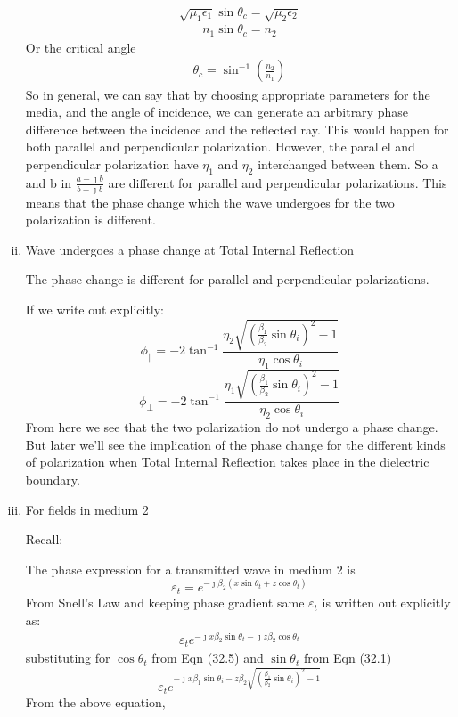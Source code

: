 \begin{enumerate}[(i)]
\begin{equation*}
\sqrt{\mu_1\epsilon_1} \sin\theta_c = \sqrt{\mu_2\epsilon_2}
\end{equation*}
\begin{align*}
n_1 \sin\theta_c = n_2
\end{align*}
Or the critical angle
\begin{align*}
\theta_c = \sin^{-1}(\frac{n_2}{n_1}) 
\end{align*}
So in general, we can say that by choosing appropriate parameters for the media, and the angle of incidence, we can generate an arbitrary phase difference between the incidence and the reflected ray. This would happen for both parallel and perpendicular polarization. However, the parallel and perpendicular polarization have $\eta_1$ and $\eta_2$
interchanged between them. So a and b in $\frac{a - \jmath b}{b + \jmath b}$ are different for parallel and perpendicular polarizations. This means that the phase change which the wave undergoes for the two polarization is different.

\item Wave undergoes a phase change at Total Internal Reflection

The phase change is different for parallel and perpendicular polarizations.

If we write out explicitly:
\begin{equation}
\phi_\parallel = -2\tan^{-1}\frac{\eta_2\sqrt{(\frac{\beta_1}{\beta_2}\sin\theta_i)^2-1}}{\eta_1\cos\theta_i}
\end{equation}
\begin{equation}
\phi_\perp = -2\tan^{-1}\frac{\eta_1\sqrt{(\frac{\beta_1}{\beta_2}\sin\theta_i)^2-1}}{\eta_2\cos\theta_i}
\end{equation}
From here we see that the two polarization do not undergo a phase change. But later we'll see the implication of the phase change for the different kinds of polarization when Total Internal Reflection takes place in the dielectric boundary. 

\item For fields in medium 2

Recall:

The phase expression for a transmitted wave in medium 2 is
\begin{equation*}
\varepsilon_t = e^{-\jmath \beta_2(x\sin\theta_t + z\cos\theta_t)}
\end{equation*}
From Snell's Law and keeping phase gradient same $\varepsilon_t$ is written out explicitly as:
\begin{align}
\varepsilon_te^{- \jmath x\beta_2\sin\theta_t - \jmath z\beta_2\cos\theta_t}
\end{align}
substituting for $\cos\theta_t$ from Eqn (32.5)
and $\sin\theta_t$ from Eqn (32.1)
\begin{equation}
\varepsilon_te^{- {\jmath x\beta_1\sin\theta_i} - z \beta_2\sqrt{{(\frac{\beta_1}{\beta_2}\sin\theta_i)}^2 - 1}}
\end{equation}
From the above equation,


\end{enumerate}
